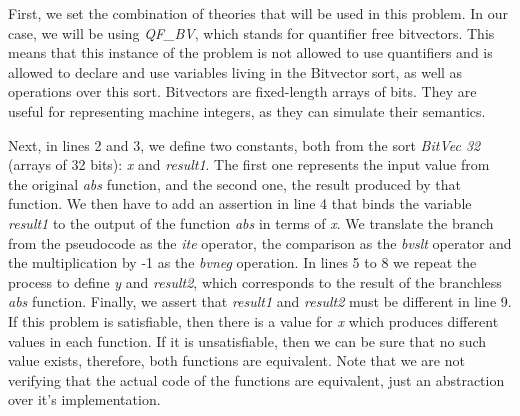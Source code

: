 First, we set the combination of theories that will be used in this problem. In our case, we will be using \textit{QF\_BV}, which stands for quantifier free bitvectors. This means that this instance of the problem is not allowed to use quantifiers and is allowed to declare and use variables living in the Bitvector sort, as well as operations over this sort. Bitvectors are fixed-length arrays of bits. They are useful for representing machine integers, as they can simulate their semantics.

Next, in lines 2 and 3, we define two constants, both from the sort \textit{BitVec 32} (arrays of 32 bits): \textit{x} and \textit{result1}. The first one represents the input value from the original \textit{abs} function, and the second one, the result produced by that function. We then have to add an assertion in line 4 that binds the variable \textit{result1} to the output of the function \textit{abs} in terms of \textit{x}. We translate the branch from the pseudocode as the \textit{ite} operator, the comparison as the \textit{bvslt} operator and the multiplication by -1 as the \textit{bvneg} operation. In lines 5 to 8 we repeat the process to define \textit{y} and \textit{result2}, which corresponds to the result of the branchless \textit{abs} function. Finally, we assert that \textit{result1} and \textit{result2} must be different in line 9. If this problem is satisfiable, then there is a value for \textit{x} which produces different values in each function. If it is unsatisfiable, then we can be sure that no such value exists, therefore, both functions are equivalent. Note that we are not verifying that the actual code of the functions are equivalent, just an abstraction over it's implementation.

%

